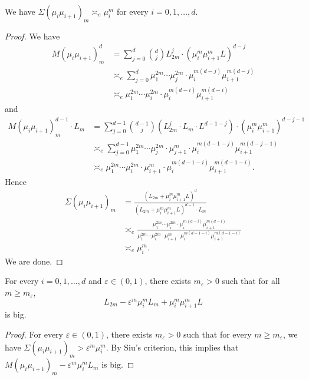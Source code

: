 \begin{lemma}\label{lemma:estimation_of_Sigma}
	We have $\Sigma(\mu_i\mu_{i+1})_m \asymp_e \mu_i^m$ for every $i = 0, 1, \ldots, d$.
\end{lemma}
\begin{proof}
	We have
	\begin{align*}
		M(\mu_i \mu_{i+1})_m^d & = \sum_{j=0}^{d} \binom{d}{j} L_{2m}^{j} \cdot (\mu_i^m \mu_{i+1}^m L)^{d-j}                 \\
		                       & \asymp_e \sum_{j=0}^{d} \mu_1^{2m} \cdots \mu_j^{2m} \cdot \mu_i^{m(d-j)} \mu_{i+1}^{m(d-j)} \\
		                       & \asymp_e \mu_1^{2m} \cdots \mu_i^{2m} \cdot \mu_{i}^{m(d-i)} \mu_{i+1}^{m(d-i)}
	\end{align*}
	and
	\begin{align*}
		M(\mu_i \mu_{i+1})_m^{d-1} \cdot L_m & = \sum_{j=0}^{d-1} \binom{d-1}{j} \left(L_{2m}^{j} \cdot L_m \cdot L^{d-1-j} \right) \cdot (\mu_i^m \mu_{i+1}^m)^{d-j-1} \\
		                                     & \asymp_e \sum_{j=0}^{d-1} \mu_1^{2m} \cdots \mu_j^{2m} \cdot \mu_{j+1}^m \cdot \mu_i^{m(d-1-j)} \mu_{i+1}^{m(d-j-1)}     \\
		                                     & \asymp_e \mu_1^{2m} \cdots \mu_{i}^{2m} \cdot \mu_{i+1}^m \cdot \mu_i^{m(d-1-i)} \mu_{i+1}^{m(d-1-i)}.
	\end{align*}
	Hence
	\begin{align*}
		\Sigma(\mu_i\mu_{i+1})_m & = \frac{(L_{2m} + \mu_i^m \mu_{i+1}^m L)^{d}}{(L_{2m} + \mu_i^m \mu_{i+1}^m L)^{d-1} \cdot L_m}                                                                                      \\
		                         & \asymp_e \frac{\mu_1^{2m} \cdots \mu_i^{2m} \cdot \mu_{i}^{m(d-i)} \mu_{i+1}^{m(d-i)}}{\mu_1^{2m} \cdots \mu_{i}^{2m} \cdot \mu_{i+1}^m \cdot \mu_i^{m(d-1-i)} \mu_{i+1}^{m(d-1-i)}} \\
		                         & \asymp_e \mu_i^m.
	\end{align*}
	We are done.
\end{proof}

\begin{theorem}\label{thm:big_inequality_by_mu_i}
	For every $i = 0, 1, \ldots, d$ and $\varepsilon \in (0, 1)$, there exists $m_\varepsilon > 0$ such that for all $m \geq m_\varepsilon$,
	\[  L_{2m} - \varepsilon^m \mu_i^m L_m + \mu_i^m \mu_{i+1}^m L \]
	is big.
\end{theorem}
\begin{proof}
	For every $\varepsilon \in (0, 1)$, there exists $m_\varepsilon > 0$ such that for every $m \geq m_\varepsilon$, we have $\Sigma(\mu_i \mu_{i+1})_m > \varepsilon^m \mu_i^m$.
	By Siu's criterion, this implies that $M(\mu_i \mu_{i+1})_m - \varepsilon^m \mu_i^m L_m$ is big.
\end{proof}



